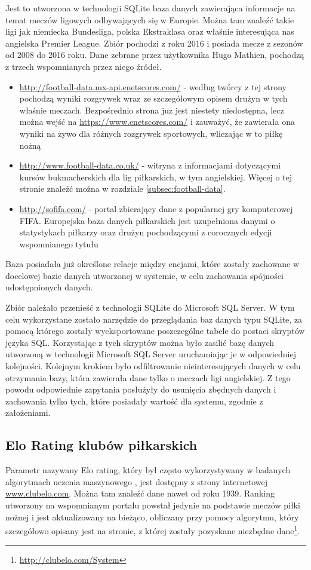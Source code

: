         Jest to utworzona w technologii SQLite baza danych zawierająca informacje na temat meczów ligowych odbywających się w Europie. Można tam znaleźć takie ligi jak niemiecka Bundesliga, polska Ekstraklasa oraz właśnie interesująca nas angielska Premier League. Zbiór pochodzi z roku 2016 i posiada mecze z sezonów od 2008 do 2016 roku. 
        Dane zebrane przez użytkownika Hugo Mathien, pochodzą z trzech wspomnianych przez niego źródeł.
        \begin{itemize}
            \item \url{http://football-data.mx-api.enetscores.com/} - według twórcy z tej strony pochodzą wyniki rozgrywek wraz ze szczegółowym opisem drużyn w tych właśnie meczach. Bezpośrednio strona juz jest niestety niedostępna, lecz można wejść na \url{https://www.enetscores.com/} i zauważyć, że zawierała ona wyniki na żywo dla różnych rozgrywek sportowych, wliczając w to piłkę nożną
            \item \url{http://www.football-data.co.uk/} - witryna z informacjami dotyczącymi kursów bukmacherskich dla lig piłkarskich,  w tym angielskiej. Więcej o tej stronie znaleźć można w rozdziale \ref{subsec:football-data}.
            \item \url{http://sofifa.com/} - portal zbierający dane z popularnej gry komputerowej FIFA. Europejska baza danych piłkarskich jest uzupełniona danymi o statystykach piłkarzy oraz drużyn pochodzącymi z corocznych edycji wspomnianego tytułu
        \end{itemize}
        Baza posiadała już określone relacje między encjami, które zostały zachowane w docelowej bazie danych utworzonej w systemie, w celu zachowania spójności udostępnionych danych. 
        
        Zbiór należało przenieść z technologii SQLite do Microsoft SQL Server. W tym celu wykorzystane zostało narzędzie do przeglądania baz danych typu SQLite, za pomocą którego zostały wyeksportowane poszczególne tabele do postaci skryptów języka SQL. Korzystając z tych skryptów można było zasilić bazę danych utworzoną w technologii Microsoft SQL Server uruchamiając je w odpowiedniej kolejności. Kolejnym krokiem było odfiltrowanie nieinteresujących danych w celu otrzymania bazy, która zawierała dane tylko o meczach ligi angielskiej. Z tego powodu odpowiednie zapytania posłużyły do usunięcia zbędnych danych i zachowania tylko tych, które posiadały wartość dla systemu, zgodnie z założeniami.
        
        \subsection{Elo Rating klubów piłkarskich}
        \noindent Parametr nazywany Elo rating, który był często wykorzystywany w badanych algorytmach uczenia maszynowego \cite{EloRating-1}, jest dostępny z strony internetowej \url{www.clubelo.com}. Można tam znaleźć dane nawet od roku 1939. Ranking utworzony na wspomnianym portalu powstał jedynie na podstawie meczów piłki nożnej i jest aktualizowany na bieżąco, obliczany przy pomocy algorytmu, który szczegółowo opisany jest na stronie, z której zostały pozyskane niezbędne dane\footnote{\url{http://clubelo.com/System}}.
        

